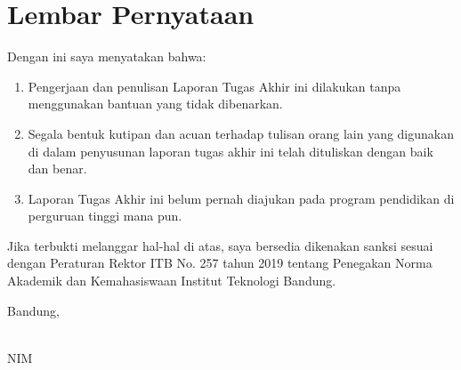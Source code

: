 \chapter*{Lembar Pernyataan}

Dengan ini saya menyatakan bahwa:

\begin{enumerate}

	\item Pengerjaan dan penulisan Laporan Tugas Akhir ini dilakukan tanpa menggunakan bantuan yang tidak dibenarkan.
	\item Segala bentuk kutipan dan acuan terhadap tulisan orang lain yang digunakan di dalam penyusunan laporan tugas akhir ini telah dituliskan dengan baik dan benar.
	\item Laporan Tugas Akhir ini belum pernah diajukan pada program pendidikan di perguruan tinggi mana pun.

\end{enumerate}

Jika terbukti melanggar hal-hal di atas, saya bersedia dikenakan sanksi sesuai dengan Peraturan Rektor ITB No. 257 tahun 2019 tentang Penegakan Norma Akademik dan Kemahasiswaan Institut Teknologi Bandung.
\vspace{15mm}

Bandung, \tanggalpengesahan

\vspace{2.5cm}
\namapenulis \\
NIM \nimpenulis
